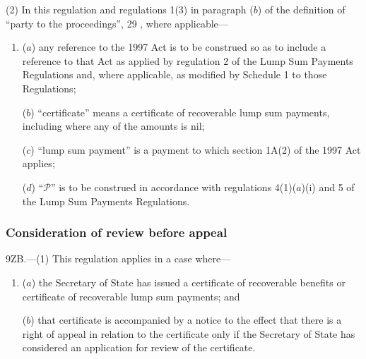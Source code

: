 \documentclass[12pt,a4paper]{article}
\begin{document}
(2) In this regulation and regulations 1(3) in paragraph ($b$)  of the definition of “party to the proceedings”, 
29%
, where applicable—
\begin{enumerate}\item[]
($a$) any reference to the 1997 Act is to be construed so as to include a reference to that Act as applied by regulation 2 of the Lump Sum Payments Regulations and, where applicable, as modified by Schedule 1 to those Regulations;


($b$) “certificate” means a certificate of recoverable lump sum payments, including where any of the amounts is nil;

($c$) “lump sum payment” is a payment to which section 1A(2) of the 1997 Act  applies;

($d$) “$\mathcal{P}$” is to be construed in accordance with regulations 4(1)($a$)(i)  and 5 of the Lump Sum Payments Regulations.
\end{enumerate}


\subsubsection[9ZB. Consideration of review before appeal]{Consideration of review before appeal}

9ZB.---(1)  This regulation applies in a case where—
\begin{enumerate}\item[]
($a$) the Secretary of State has issued a certificate of recoverable benefits or certificate of recoverable lump sum payments; and

($b$) that certificate is accompanied by a notice to the effect that there is a right of appeal in relation to the certificate only if the Secretary of State has considered an application for review of the certificate.
\end{enumerate}
\end{document}
